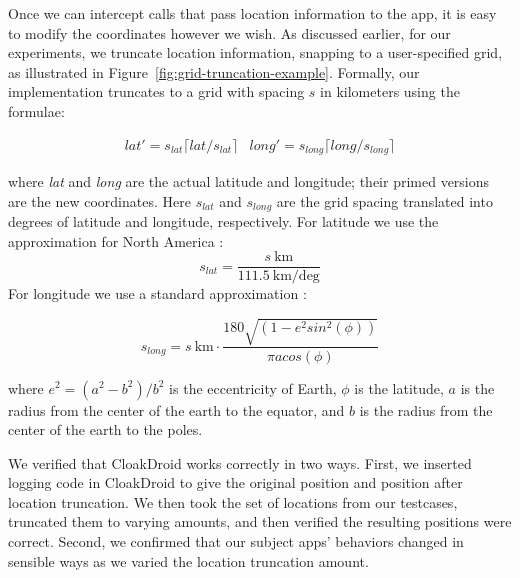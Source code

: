 \documentclass[10pt, conference, compsocconf]{IEEEtran}
\newcommand{\fuzzer}{CloakDroid\xspace}
\begin{document}
{Once we can intercept calls that pass location information to the app,
it is easy to modify the coordinates however we wish. As discussed
earlier, for our experiments, we truncate location information,
snapping to a user-specified grid, as illustrated in
Figure~\ref{fig:grid-truncation-example}.  Formally, our
implementation truncates to a grid with spacing $s$ in kilometers
using the formulae:

\begin{displaymath}
  \begin{array}{cc}
    \textit{lat}' = s_\textit{lat} \lceil \textit{lat} /s_\textit{lat} \rceil &
    \textit{long}' = s_\textit{long} \lceil \textit{long} /s_\textit{long} \rceil
  \end{array}
\end{displaymath}

\noindent where \textit{lat} and \textit{long} are the actual latitude and
longitude; their primed versions are the new coordinates. Here
$s_\textit{lat}$ and $s_\textit{long}$ are the grid spacing translated
into degrees of latitude and longitude, respectively.
For latitude we use the approximation for North America \cite{latitude-calculator}:
\begin{displaymath}
s_\textit{lat} = \frac{s~\textrm{km}}{111.5~\textrm{km/deg}}
\end{displaymath}
For longitude we use a standard approximation \cite{rapp:geometric}:

\[
s_\textit{long} = s~\textrm{km} \cdot 
  \frac {180 \sqrt{(1 - e^2 sin^2(\phi))}}
  {\pi a cos(\phi)}
\]

\noindent where $e^2 = (a^2 - b^2)/b^2$ is the eccentricity of Earth, $\phi$ is
the latitude, $a$ is the radius from the center of the earth to the
equator, and $b$ is the radius from the center of the earth to the poles.

We verified that \fuzzer{} works correctly in two ways.  First, we 
inserted logging code in \fuzzer{} to give the original position and 
position after location truncation.  We then took the set of locations from our 
testcases, truncated them to varying amounts, and then verified the
resulting positions were correct.  Second, we confirmed that our subject apps'
behaviors changed in sensible ways as we varied the location truncation 
amount.

}
\end{document}
